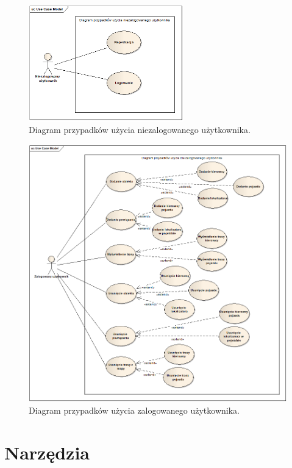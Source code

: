 \begin{figure}
\centering
\includegraphics[width=0.6\textwidth]{./graf/Przypadki_uzycia_niezalogowany.png}
\caption{Diagram przypadków użycia niezalogowanego użytkownika.}
\label{fig:3.1}
\end{figure}

\begin{figure}
\centering
\includegraphics[width=1\textwidth]{./graf/Przypadki_uzycia_zalogowany.png}
\caption{Diagram przypadków użycia zalogowanego użytkownika.}
\label{fig:3.2}
\end{figure}

\section{Narzędzia}
